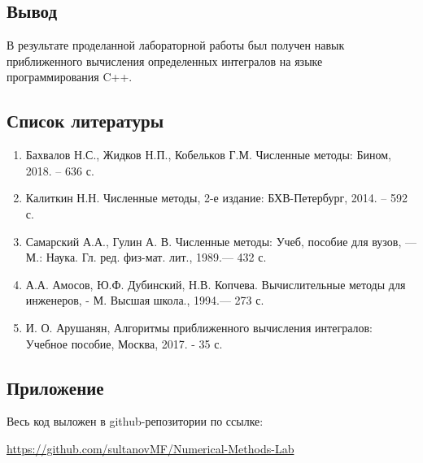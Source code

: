 \documentclass[a4paper, fontsize=14pt]{article}
\begin{document}
\subsection*{Вывод}
В результате проделанной лабораторной работы был получен навык приближенного вычисления определенных интегралов на языке программирования C++.
\newpage
\subsection*{Список литературы}
\begin{enumerate}
    \item Бахвалов Н.С., Жидков Н.П., Кобельков Г.М. Численные методы: Бином, 2018. – 636 с. 
    \item Калиткин Н.Н. Численные методы, 2-е издание: БХВ-Петербург, 2014. – 592 с.
    \item Самарский А.А., Гулин А. В. Численные методы: Учеб, пособие для вузов, — М.: Наука. Гл. ред. физ-мат. лит., 1989.— 432 с.
    \item А.А. Амосов, Ю.Ф. Дубинский, Н.В. Копчева. Вычислительные методы для инженеров, - М. Высшая школа., 1994.— 273 с.
    \item И. О. Арушанян, Алгоритмы приближенного вычисления интегралов: Учебное пособие, Москва, 2017. - 35 с.
\end{enumerate}
\newpage
\subsection*{Приложение}
Весь код выложен в github-репозитории по ссылке: 

\url{https://github.com/sultanovMF/Numerical-Methods-Lab}
\end{document}
